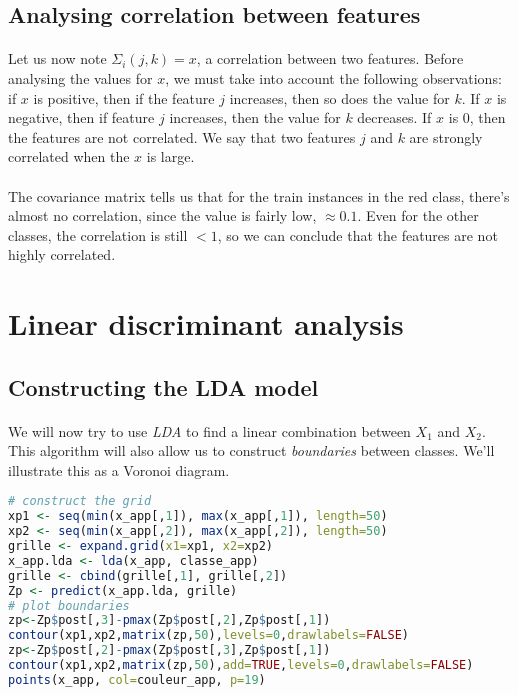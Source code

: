 \subsection{Analysing correlation between features}
\paragraph{}
Let us now note ${\Sigma}_i(j, k) = x$, a correlation between two features.
Before analysing the values for $x$, we must take into account the following observations: if $x$ is positive, then if the feature $j$ increases, then so does the value for $k$.
If $x$ is negative, then if feature $j$ increases, then the value for $k$ decreases.
If $x$ is 0, then the features are not correlated.
We say that two features $j$ and $k$ are strongly correlated when the $x$ is large.

\paragraph{}
The covariance matrix tells us that for the train instances in the red class, there's almost no correlation, since the value is fairly low, $\approx 0.1$.
Even for the other classes, the correlation is still $<1$, so we can conclude that the features are not highly correlated.

\section{Linear discriminant analysis}

\subsection{Constructing the LDA model}
\paragraph{}
We will now try to use \emph{LDA} to find a linear combination between $X_1$ and $X_2$.
This algorithm will also allow us to construct \emph{boundaries} between classes.
We'll illustrate this as a Voronoi diagram.

\begin{lstlisting}[language=R, caption=Running LDA on train data]
# construct the grid
xp1 <- seq(min(x_app[,1]), max(x_app[,1]), length=50)
xp2 <- seq(min(x_app[,2]), max(x_app[,2]), length=50)
grille <- expand.grid(x1=xp1, x2=xp2)
x_app.lda <- lda(x_app, classe_app)
grille <- cbind(grille[,1], grille[,2])
Zp <- predict(x_app.lda, grille)
# plot boundaries
zp<-Zp$post[,3]-pmax(Zp$post[,2],Zp$post[,1])
contour(xp1,xp2,matrix(zp,50),levels=0,drawlabels=FALSE)
zp<-Zp$post[,2]-pmax(Zp$post[,3],Zp$post[,1])
contour(xp1,xp2,matrix(zp,50),add=TRUE,levels=0,drawlabels=FALSE)
points(x_app, col=couleur_app, p=19)
\end{lstlisting}

